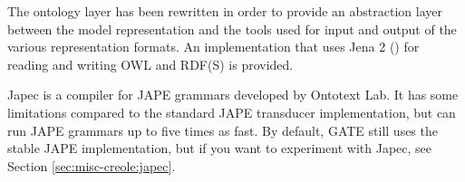  The ontology layer has been rewritten in order to
provide an abstraction layer between the model representation and the tools used
for input and output of the various representation formats. An implementation
that uses Jena 2 () for
reading and writing OWL and RDF(S) is provided.

Japec is a compiler for JAPE grammars developed by Ontotext Lab.  It has
some limitations compared to the standard JAPE transducer implementation,
but can run JAPE grammars up to five times as fast.  By default, GATE still
uses the stable JAPE implementation, but if you want to experiment with
Japec, see Section \ref{sec:misc-creole:japec}.


